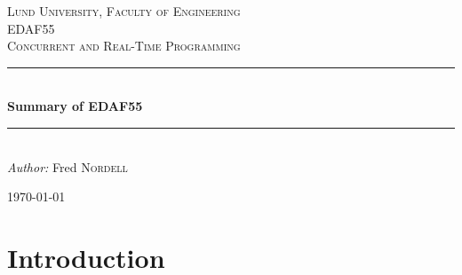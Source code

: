 \documentclass[12pt]{article} %
\begin{document}

\begin{titlepage}

\newcommand{\HRule}{\rule{\linewidth}{0.5mm}} %

\center %

\textsc{\LARGE Lund University, Faculty of Engineering}\\[1.5cm] %
\textsc{\Large EDAF55}\\[0.5cm] %
\textsc{\large Concurrent and Real-Time Programming}\\[0.5cm] %

\HRule \\[1cm]
{ \huge \bfseries Summary of EDAF55}\\[0.4cm] %
\HRule \\[1.5cm]

\emph{Author:} Fred \textsc{Nordell} %

{\large \today}\\[3cm] %


\vfill %

\end{titlepage}


\tableofcontents %
\lstlistoflistings %
\listoffigures %
\listoftables %

\newpage %


\section{Introduction} %
\end{document}
